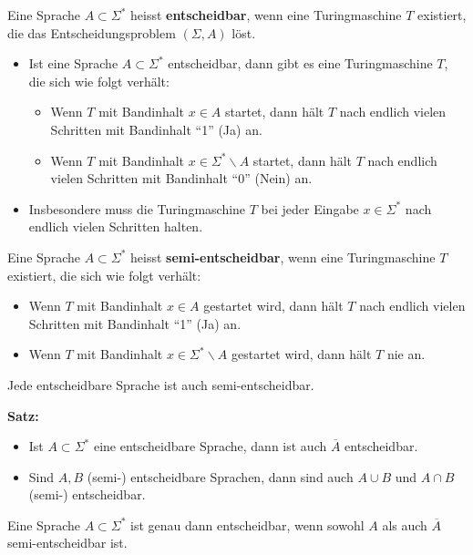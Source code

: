 

Eine Sprache $A \subset \Sigma^*$ heisst \textbf{entscheidbar}, wenn eine Turingmaschine $T$ existiert, die das Entscheidungsproblem $(\Sigma, A)$ löst.

\begin{itemize}
    \item Ist eine Sprache $A \subset \Sigma^*$ entscheidbar, dann gibt es eine Turingmaschine $T$, die sich wie folgt verhält:
    \begin{itemize}
        \item Wenn $T$ mit Bandinhalt $x \in A$ startet, dann hält $T$ nach endlich vielen Schritten mit Bandinhalt ``1'' (Ja) an.
        \item Wenn $T$ mit Bandinhalt $x \in \Sigma^* \backslash A$ startet, dann hält $T$ nach endlich vielen Schritten mit Bandinhalt ``0'' (Nein) an.
    \end{itemize}
    \item Insbesondere muss die Turingmaschine $T$ bei jeder Eingabe $x \in \Sigma^*$ nach endlich vielen Schritten halten.
\end{itemize}


Eine Sprache $A \subset \Sigma^*$ heisst \textbf{semi-entscheidbar}, wenn eine Turingmaschine $T$ existiert, die sich wie folgt verhält:
\begin{itemize}
    \item Wenn $T$ mit Bandinhalt $x \in A$ gestartet wird, dann hält $T$ nach endlich vielen Schritten mit Bandinhalt ``1'' (Ja) an.
    \item Wenn $T$ mit Bandinhalt $x \in \Sigma^* \backslash A$ gestartet wird, dann hält $T$ nie an.
\end{itemize}

Jede entscheidbare Sprache ist auch semi-entscheidbar.

\textbf{Satz:}
\begin{itemize}
    \item Ist $A \subset \Sigma^*$ eine entscheidbare Sprache, dann ist auch $\overline{A}$ entscheidbar.\\
    \item Sind $A,B$ (semi-) entscheidbare Sprachen, dann sind auch $A \cup B$ und $A \cap B$ (semi-) entscheidbar.
\end{itemize}

Eine Sprache $A \subset \Sigma^*$ ist genau dann entscheidbar, wenn sowohl $A$ als auch $\overline{A}$ semi-entscheidbar ist.

